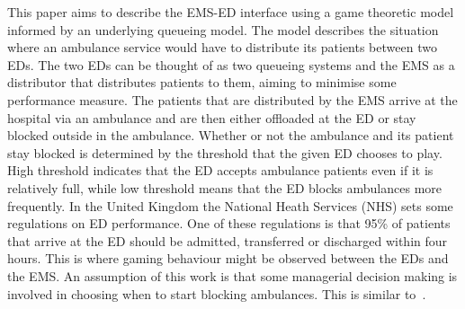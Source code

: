 This paper aims to describe the EMS-ED interface using a game theoretic model
informed by an underlying queueing model.
The model describes the situation where an ambulance service would
have to distribute its patients between two EDs.
The two EDs can be thought of as two queueing systems and the EMS as a 
distributor that distributes patients to them, aiming to minimise some
performance measure.
The patients that are distributed by the EMS arrive at the hospital via an 
ambulance and are then either offloaded at the ED or stay blocked outside in 
the ambulance.
Whether or not the ambulance and its patient stay blocked is determined by 
the threshold that the given ED chooses to play.
High threshold indicates that the ED accepts ambulance patients even if it is 
relatively full, while low threshold means that the ED blocks ambulances more 
frequently.
In the United Kingdom the National Heath Services (NHS) sets some regulations 
on ED performance.
One of these regulations is that 95\% of patients that arrive at the ED should 
be admitted, transferred or discharged within four hours.
This is where gaming behaviour might be observed between the EDs and the EMS.
An assumption of this work is that some managerial decision making is involved
in choosing when to start blocking ambulances.
This is similar to~\cite{deo2011centralized}.

